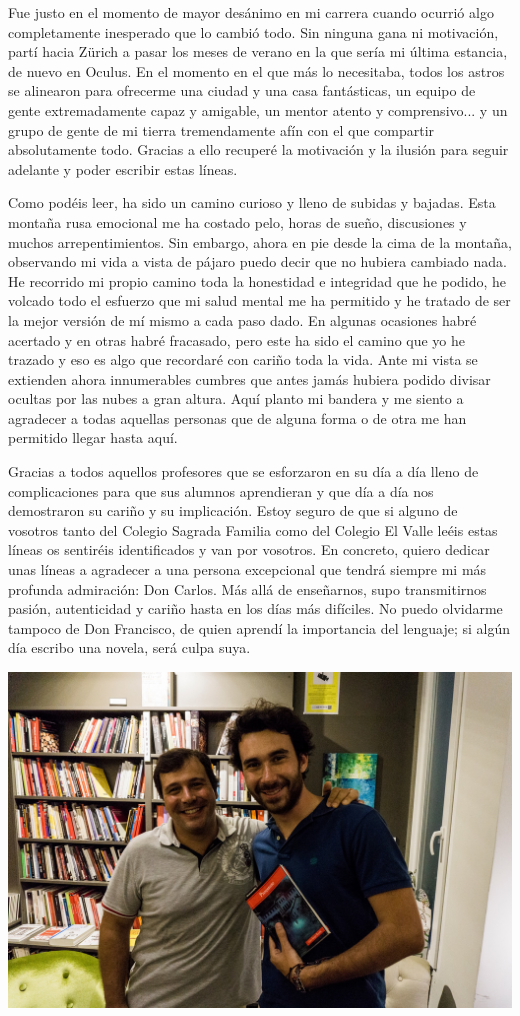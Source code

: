 \newpage

Fue justo en el momento de mayor desánimo en mi carrera cuando ocurrió algo completamente inesperado que lo cambió todo. Sin ninguna gana ni motivación, partí hacia Zürich a pasar los meses de verano en la que sería mi última estancia, de nuevo en Oculus. En el momento en el que más lo necesitaba, todos los astros se alinearon para ofrecerme una ciudad y una casa fantásticas, un equipo de gente extremadamente capaz y amigable, un mentor atento y comprensivo... y un grupo de gente de mi tierra tremendamente afín con el que compartir absolutamente todo. Gracias a ello recuperé la motivación y la ilusión para seguir adelante y poder escribir estas líneas.

Como podéis leer, ha sido un camino curioso y lleno de subidas y bajadas. Esta montaña rusa emocional me ha costado pelo, horas de sueño, discusiones y muchos arrepentimientos. Sin embargo, ahora en pie desde la cima de la montaña, observando mi vida a vista de pájaro puedo decir que no hubiera cambiado nada. He recorrido mi propio camino toda la honestidad e integridad que he podido, he volcado todo el esfuerzo que mi salud mental me ha permitido y he tratado de ser la mejor versión de mí mismo a cada paso dado. En algunas ocasiones habré acertado y en otras habré fracasado, pero este ha sido el camino que yo he trazado y eso es algo que recordaré con cariño toda la vida.
Ante mi vista se extienden ahora innumerables cumbres que antes jamás hubiera podido divisar ocultas por las nubes a gran altura. Aquí planto mi bandera y me siento a agradecer a todas aquellas personas que de alguna forma o de otra me han permitido llegar hasta aquí.

Gracias a todos aquellos profesores que se esforzaron en su día a día lleno de complicaciones para que sus alumnos aprendieran y que día a día nos demostraron su cariño y su implicación. Estoy seguro de que si alguno de vosotros tanto del Colegio Sagrada Familia como del Colegio El Valle leéis estas líneas os sentiréis identificados y van por vosotros. En concreto, quiero dedicar unas líneas a agradecer a una persona excepcional que tendrá siempre mi más profunda admiración: Don Carlos. Más allá de enseñarnos, supo transmitirnos pasión, autenticidad y cariño hasta en los días más difíciles. No puedo olvidarme tampoco de Don Francisco, de quien aprendí la importancia del lenguaje; si algún día escribo una novela, será culpa suya.

\begin{center}
\includegraphics[width=0.7\linewidth]{Figures/Ack/valle2}
\end{center}

